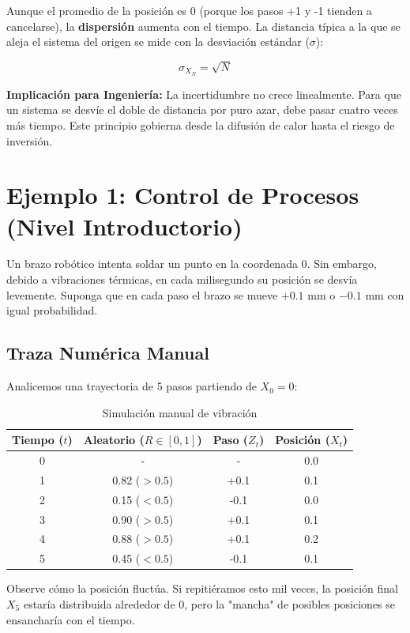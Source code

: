 \documentclass[11pt, letterpaper]{article}
\begin{document}
Aunque el promedio de la posición es 0 (porque los pasos +1 y -1 tienden a cancelarse), la \textbf{dispersión} aumenta con el tiempo. La distancia típica a la que se aleja el sistema del origen se mide con la desviación estándar ($\sigma$):

\begin{equation} \label{eq:sqrt_law}
    \sigma_{X_N} = \sqrt{N}
\end{equation}

\textbf{Implicación para Ingeniería:} La incertidumbre no crece linealmente. Para que un sistema se desvíe el doble de distancia por puro azar, debe pasar cuatro veces más tiempo. Este principio gobierna desde la difusión de calor hasta el riesgo de inversión.

\section{Ejemplo 1: Control de Procesos (Nivel Introductorio)}

Un brazo robótico intenta soldar un punto en la coordenada 0. Sin embargo, debido a vibraciones térmicas, en cada milisegundo su posición se desvía levemente.
Suponga que en cada paso el brazo se mueve $+0.1$ mm o $-0.1$ mm con igual probabilidad.

\subsection{Traza Numérica Manual}
Analicemos una trayectoria de 5 pasos partiendo de $X_0 = 0$:

\begin{table}[H]
\centering
\begin{tabular}{|c|c|c|c|}
\hline
\textbf{Tiempo ($t$)} & \textbf{Aleatorio ($R \in [0,1]$)} & \textbf{Paso ($Z_t$)} & \textbf{Posición ($X_t$)} \\ \hline
0 & - & - & 0.0 \\ \hline
1 & 0.82 ($>0.5$) & +0.1 & 0.1 \\ \hline
2 & 0.15 ($<0.5$) & -0.1 & 0.0 \\ \hline
3 & 0.90 ($>0.5$) & +0.1 & 0.1 \\ \hline
4 & 0.88 ($>0.5$) & +0.1 & 0.2 \\ \hline
5 & 0.45 ($<0.5$) & -0.1 & 0.1 \\ \hline
\end{tabular}
\caption{Simulación manual de vibración}
\end{table}

Observe cómo la posición fluctúa. Si repitiéramos esto mil veces, la posición final $X_5$ estaría distribuida alrededor de 0, pero la "mancha" de posibles posiciones se ensancharía con el tiempo.
\end{document}
